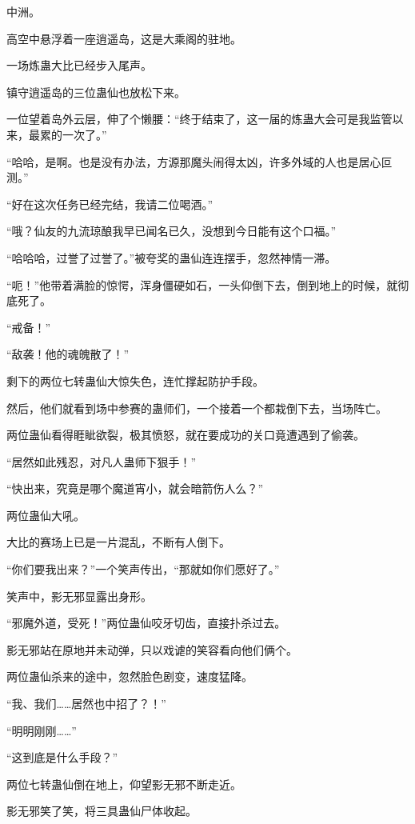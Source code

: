 
\begin{this_body}

中洲。

高空中悬浮着一座逍遥岛，这是大乘阁的驻地。

一场炼蛊大比已经步入尾声。

镇守逍遥岛的三位蛊仙也放松下来。

一位望着岛外云层，伸了个懒腰：“终于结束了，这一届的炼蛊大会可是我监管以来，最累的一次了。”

“哈哈，是啊。也是没有办法，方源那魔头闹得太凶，许多外域的人也是居心叵测。”

“好在这次任务已经完结，我请二位喝酒。”

“哦？仙友的九流琼酿我早已闻名已久，没想到今日能有这个口福。”

“哈哈哈，过誉了过誉了。”被夸奖的蛊仙连连摆手，忽然神情一滞。

“呃！”他带着满脸的惊愕，浑身僵硬如石，一头仰倒下去，倒到地上的时候，就彻底死了。

“戒备！”

“敌袭！他的魂魄散了！”

剩下的两位七转蛊仙大惊失色，连忙撑起防护手段。

然后，他们就看到场中参赛的蛊师们，一个接着一个都栽倒下去，当场阵亡。

两位蛊仙看得睚眦欲裂，极其愤怒，就在要成功的关口竟遭遇到了偷袭。

“居然如此残忍，对凡人蛊师下狠手！”

“快出来，究竟是哪个魔道宵小，就会暗箭伤人么？”

两位蛊仙大吼。

大比的赛场上已是一片混乱，不断有人倒下。

“你们要我出来？”一个笑声传出，“那就如你们愿好了。”

笑声中，影无邪显露出身形。

“邪魔外道，受死！”两位蛊仙咬牙切齿，直接扑杀过去。

影无邪站在原地并未动弹，只以戏谑的笑容看向他们俩个。

两位蛊仙杀来的途中，忽然脸色剧变，速度猛降。

“我、我们……居然也中招了？！”

“明明刚刚……”

“这到底是什么手段？”

两位七转蛊仙倒在地上，仰望影无邪不断走近。

影无邪笑了笑，将三具蛊仙尸体收起。


\end{this_body}
